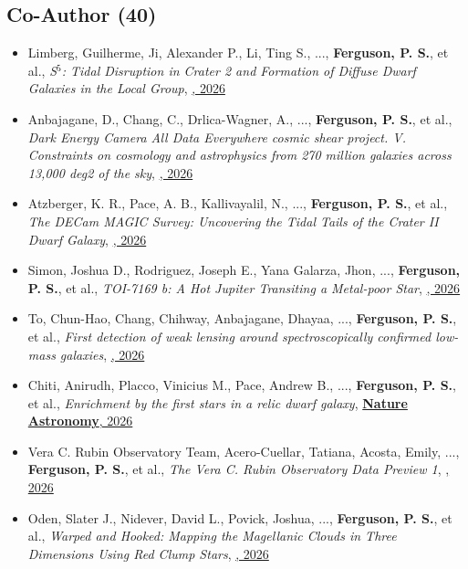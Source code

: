 \subsection{Co-Author  (40)}
\begin{itemize}[itemsep=1pt]
    \item {Limberg}, Guilherme, {Ji}, Alexander P., {Li}, Ting S., ..., \textbf{Ferguson, P. S.}, et al., \textit{{S$^{5}$: Tidal Disruption in Crater 2 and Formation of Diffuse Dwarf Galaxies in the Local Group}}, \href{https://ui.adsabs.harvard.edu/abs/2026ApJ..1010....9L}{\textbf{\apj}, 2026}
    \item {Anbajagane}, D., {Chang}, C., {Drlica-Wagner}, A., ..., \textbf{Ferguson, P. S.}, et al., \textit{{Dark Energy Camera All Data Everywhere cosmic shear project. V. Constraints on cosmology and astrophysics from 270 million galaxies across 13,000 deg2 of the sky}}, \href{https://ui.adsabs.harvard.edu/abs/2026PhRvD.114d3527A}{\textbf{\prd}, 2026}
    \item {Atzberger}, K. R., {Pace}, A. B., {Kallivayalil}, N., ..., \textbf{Ferguson, P. S.}, et al., \textit{{The DECam MAGIC Survey: Uncovering the Tidal Tails of the Crater II Dwarf Galaxy}}, \href{https://ui.adsabs.harvard.edu/abs/2026ApJ..1006..180A}{\textbf{\apj}, 2026}
    \item {Simon}, Joshua D., {Rodriguez}, Joseph E., {Yana Galarza}, Jhon, ..., \textbf{Ferguson, P. S.}, et al., \textit{{TOI-7169 b: A Hot Jupiter Transiting a Metal-poor Star}}, \href{https://ui.adsabs.harvard.edu/abs/2026AJ....172..118S}{\textbf{\aj}, 2026}
    \item {To}, Chun-Hao, {Chang}, Chihway, {Anbajagane}, Dhayaa, ..., \textbf{Ferguson, P. S.}, et al., \textit{{First detection of weak lensing around spectroscopically confirmed low-mass galaxies}}, \href{https://ui.adsabs.harvard.edu/abs/2026PhRvD.114b3040T}{\textbf{\prd}, 2026}
    \item {Chiti}, Anirudh, {Placco}, Vinicius M., {Pace}, Andrew B., ..., \textbf{Ferguson, P. S.}, et al., \textit{{Enrichment by the first stars in a relic dwarf galaxy}}, \href{https://ui.adsabs.harvard.edu/abs/2026NatAs..10..830C}{\textbf{Nature Astronomy}, 2026}
    \item {Vera C. Rubin Observatory Team}, {Acero-Cuellar}, Tatiana, {Acosta}, Emily, ..., \textbf{Ferguson, P. S.}, et al., \textit{{The Vera C. Rubin Observatory Data Preview 1}}, \href{https://ui.adsabs.harvard.edu/abs/2026AJ....171..360V}{\textbf{\aj}, 2026}
    \item {Oden}, Slater J., {Nidever}, David L., {Povick}, Joshua, ..., \textbf{Ferguson, P. S.}, et al., \textit{{Warped and Hooked: Mapping the Magellanic Clouds in Three Dimensions Using Red Clump Stars}}, \href{https://ui.adsabs.harvard.edu/abs/2026ApJ..1003....9O}{\textbf{\apj}, 2026}

\end{itemize}
